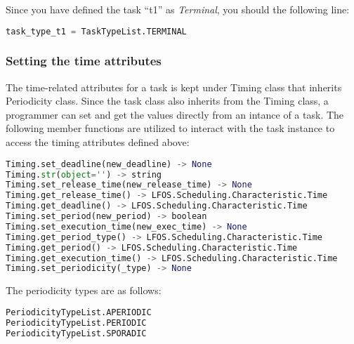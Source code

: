\documentclass[]{scrartcl}
\begin{document}
                
Since you have defined the task ``t1'' as \emph{Terminal}, you should the following line:

\begin{lstlisting}[language=Python, frame=single, label={lst:TaskTypeInstt1}, caption={Terminal task type definition.}]
task_type_t1 = TaskTypeList.TERMINAL
\end{lstlisting}
        
        
\subsubsection{Setting the time attributes}
The time-related attributes for a task is kept under \textsf{Timing} class that inherits \textsf{Periodicity} class. Since the task class also inherits from the Timing class, a programmer can set and get the values directly
from an intance of a task. The following member functions are utilized to interact with the task instance to access the timing attributes defined above:

\begin{lstlisting}[language=Python, frame=single, label={lst:t1memberFunctionsTiming}, caption={The member functions for \textsf{Timing} module.}]
Timing.set_deadline(new_deadline) -> None
Timing.str(object='') -> string
Timing.set_release_time(new_release_time) -> None
Timing.get_release_time() -> LFOS.Scheduling.Characteristic.Time
Timing.get_deadline() -> LFOS.Scheduling.Characteristic.Time
Timing.set_period(new_period) -> boolean
Timing.set_execution_time(new_exec_time) -> None
Timing.get_period_type() -> LFOS.Scheduling.Characteristic.Time
Timing.get_period() -> LFOS.Scheduling.Characteristic.Time
Timing.get_execution_time() -> LFOS.Scheduling.Characteristic.Time
Timing.set_periodicity(_type) -> None
\end{lstlisting}
        

The periodicity types are as follows:

\begin{lstlisting}[language=Python, frame=single, label={lst:t1PerioidictyTypeList}, caption={The \textsf{Periodicity} type enumeration.}]
PeriodicityTypeList.APERIODIC
PeriodicityTypeList.PERIODIC
PeriodicityTypeList.SPORADIC
\end{lstlisting}
        
        
\end{document}
